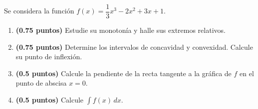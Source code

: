 
Se considera la función $f(x)=\dfrac{1}{3}x^3-2x^2+3x+1$.
\begin{enumerate}[label=\alph*)]
  \item \textbf{(0.75 puntos)} Estudie su monotonía y halle sus extremos
  relativos.
  \item \textbf{(0.75 puntos)} Determine los intervalos de concavidad y
  convexidad. Calcule su punto de inflexión.
  \item \textbf{(0.5 puntos)} Calcule la pendiente de la recta tangente a
  la gráfica de $f$ en el punto de abscisa $x=0$.
  \item \textbf{(0.5 puntos)} Calcule $\displaystyle\int f(x)\,dx$.
\end{enumerate}
